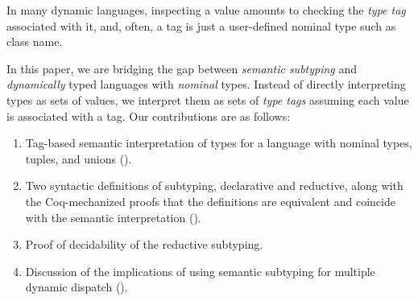 In many dynamic languages, inspecting a value 
amounts to checking the \emph{type tag} associated with it, 
and, often, a tag is just a user-defined nominal type such as class name.

In this paper, we are bridging the gap between \emph{semantic subtyping} and 
\emph{dynamically} typed languages with \emph{nominal} types.
Instead of directly interpreting types as sets of values,
we interpret them as sets of \emph{type tags} assuming 
each value is associated with a tag.
Our contributions are as follows:
\begin{enumerate}
  \item Tag-based semantic interpretation of types for a language
    with nominal types, tuples, and unions ().
  \item Two syntactic definitions of subtyping, declarative and reductive,
    along with the Coq-mechanized proofs that the definitions are equivalent
    and coincide with the semantic interpretation (). 	
  \item Proof of decidability of the reductive subtyping.
  \item Discussion of the implications of using semantic subtyping
    for multiple dynamic dispatch ().
\end{enumerate}






